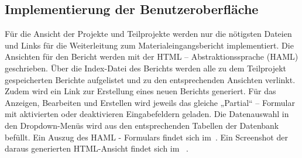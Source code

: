 \subsection{Implementierung der Benutzeroberfläche}
Für die Ansicht der Projekte und Teilprojekte werden nur die nötigsten Dateien und Links für die Weiterleitung zum Materialeingangsbericht implementiert. Die Ansichten für den Bericht werden mit der HTML – Abstraktionssprache (\acs{HAML}) geschrieben. Über die Index-Datei des Berichts werden alle zu dem Teilprojekt gespeicherten Berichte aufgelistet und zu den entsprechenden Ansichten verlinkt. Zudem wird ein Link zur Erstellung eines neuen Berichts generiert. Für das Anzeigen, Bearbeiten und Erstellen wird jeweils das gleiche „Partial“ – Formular mit aktivierten oder deaktivieren Eingabefeldern geladen. Die Datenauswahl in den Dropdown-Menüs wird aus den entsprechenden Tabellen der Datenbank befüllt. Ein Auszug des HAML - Formulars findet sich im~. Ein Screenshot der daraus generierten HTML-Ansicht findet sich im ~.

